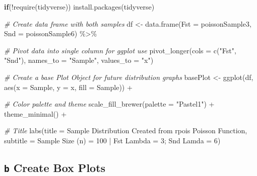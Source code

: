 \documentclass[
  12pt,
]{article}
\newenvironment{Shaded}{\begin{snugshade}}{\end{snugshade}}
\newcommand{\AttributeTok}[1]{\textcolor[rgb]{0.77,0.63,0.00}{#1}}
\newcommand{\CommentTok}[1]{\textcolor[rgb]{0.56,0.35,0.01}{\textit{#1}}}
\newcommand{\ControlFlowTok}[1]{\textcolor[rgb]{0.13,0.29,0.53}{\textbf{#1}}}
\newcommand{\FunctionTok}[1]{\textcolor[rgb]{0.00,0.00,0.00}{#1}}
\newcommand{\NormalTok}[1]{#1}
\newcommand{\OtherTok}[1]{\textcolor[rgb]{0.56,0.35,0.01}{#1}}
\newcommand{\SpecialCharTok}[1]{\textcolor[rgb]{0.00,0.00,0.00}{#1}}
\newcommand{\StringTok}[1]{\textcolor[rgb]{0.31,0.60,0.02}{#1}}
\begin{document}
\begin{Shaded}
\begin{Highlighting}[]
\ControlFlowTok{if}\NormalTok{(}\SpecialCharTok{!}\FunctionTok{require}\NormalTok{(tidyverse)) }\FunctionTok{install.packages}\NormalTok{(tidyverse)}

\CommentTok{\# Create data frame with both samples}
\NormalTok{df }\OtherTok{\textless{}{-}} \FunctionTok{data.frame}\NormalTok{(}\AttributeTok{Fst =}\NormalTok{ poissonSample3,}
                 \AttributeTok{Snd =}\NormalTok{ poissonSample6) }\SpecialCharTok{\%\textgreater{}\%}
  
  \CommentTok{\# Pivot data into single column for ggplot use}
  \FunctionTok{pivot\_longer}\NormalTok{(}\AttributeTok{cols      =} \FunctionTok{c}\NormalTok{(}\StringTok{"Fst"}\NormalTok{, }\StringTok{"Snd"}\NormalTok{),}
               \AttributeTok{names\_to  =} \StringTok{"Sample"}\NormalTok{,}
               \AttributeTok{values\_to =} \StringTok{"x"}\NormalTok{)}


\CommentTok{\# Create a base Plot Object for future distribution graphs}
\NormalTok{basePlot }\OtherTok{\textless{}{-}} \FunctionTok{ggplot}\NormalTok{(df,}
                   \FunctionTok{aes}\NormalTok{(}\AttributeTok{x =}\NormalTok{ Sample,}
                       \AttributeTok{y =}\NormalTok{ x,}
                       \AttributeTok{fill =}\NormalTok{ Sample)) }\SpecialCharTok{+} 
            
            \CommentTok{\# Color palette and theme}
            \FunctionTok{scale\_fill\_brewer}\NormalTok{(}\AttributeTok{palette =} \StringTok{"Pastel1"}\NormalTok{) }\SpecialCharTok{+}
            \FunctionTok{theme\_minimal}\NormalTok{() }\SpecialCharTok{+}
          
            \CommentTok{\# Title}
            \FunctionTok{labs}\NormalTok{(}\AttributeTok{title    =} \StringTok{\textquotesingle{}Sample Distribution Created from rpois Poisson Function\textquotesingle{}}\NormalTok{,}
                 \AttributeTok{subtitle =} \StringTok{\textquotesingle{}Sample Size (n) = 100 | Fst Lambda = 3; Snd Lamda = 6\textquotesingle{}}\NormalTok{)}
\end{Highlighting}
\end{Shaded}

\hypertarget{b-create-box-plots}{%
\subsection{\texorpdfstring{\texttt{b} Create Box
Plots}{b Create Box Plots}}\label{b-create-box-plots}}
\end{document}
